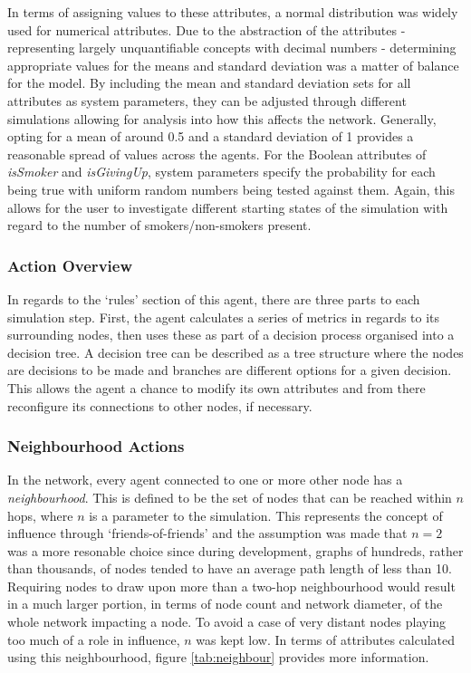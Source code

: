 \documentclass[]{report}
\begin{document}
In terms of assigning values to these attributes, a normal distribution was widely used for numerical attributes. Due to the abstraction of the attributes - representing largely unquantifiable concepts with decimal numbers - determining appropriate values for the means and standard deviation was a matter of balance for the model. By including the mean and standard deviation sets for all attributes as system parameters, they can be adjusted through different simulations allowing for analysis into how this affects the network.  Generally, opting for a mean of around 0.5 and a standard deviation of 1 provides a reasonable spread of values across the agents. For the Boolean attributes of \emph{isSmoker} and \emph{isGivingUp}, system parameters specify the probability for each being true with uniform random numbers being tested against them. Again, this allows for the user to investigate different starting states of the simulation with regard to the number of smokers/non-smokers present.

\subsubsection{Action Overview}
In regards to the `rules' section of this agent, there are three parts to each simulation step. First, the agent calculates a series of metrics in regards to its surrounding nodes, then uses these as part of a decision process organised into a decision tree. A decision tree can be described as a tree structure where the nodes are decisions to be made and branches are different options for a given decision. This allows the agent a chance to modify its own attributes and from there reconfigure its connections to other nodes, if necessary.
\subsubsection{Neighbourhood Actions}
\label{sec:neigh}
In the network, every agent connected to one or more other node has a \emph{neighbourhood}. This is defined to be the set of nodes that can be reached within $n$ hops, where $n$ is a parameter to the simulation. This represents the concept of influence through `friends-of-friends' and the assumption was made that $n=2$ was a more resonable choice since during development,  graphs of hundreds, rather than thousands, of nodes tended to have an average path length of less than 10. Requiring nodes to draw upon more than a two-hop neighbourhood would result in a much larger portion, in terms of node count and network diameter, of the whole network impacting a node. To avoid a case of very distant nodes playing too much of a role in influence, $n$ was kept low. In terms of attributes calculated using this neighbourhood, figure \ref{tab:neighbour} provides more information.
\end{document}
